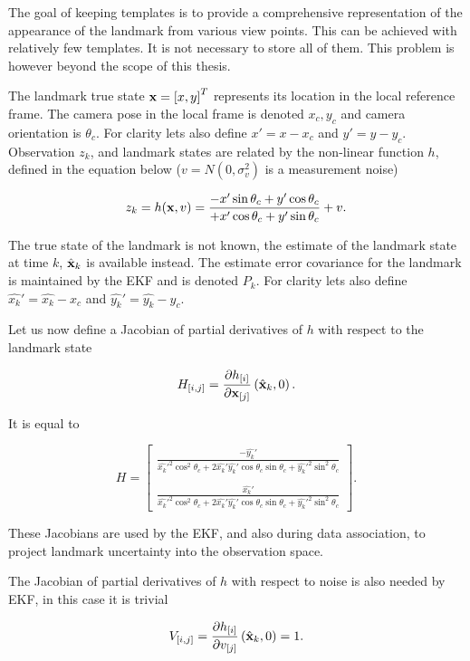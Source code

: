 The goal of keeping templates is to provide a comprehensive
representation of the appearance of the landmark from various view
points. This can be achieved with relatively few templates. It is not
necessary to store all of them.  This problem is however beyond the scope of this thesis.

The landmark true state ${\bf x} = \left[x,y \right]^T$ represents its
location in the local reference frame. The camera pose in the local frame
is denoted $x_c,y_c$ and camera orientation is $\theta_c$. For clarity
lets also define $x'=x-x_c$ and $y'=y-y_c$.  Observation $z_k$, and
landmark states are related by the non-linear function $h$, defined in
the equation below ($v = N(0,\sigma_{v}^2)$ is a measurement noise)

$$
z_k = h({\bf x},v) =
\frac{-x'\sin \theta_c + y' \cos \theta_c }
     {+x'\cos \theta_c + y' \sin \theta_c } + v.
$$

The true state of the landmark is not known, the estimate of the
landmark state at time $k$, $\hat{\bf x}_k$ is available
instead. The estimate error covariance for the landmark is maintained by
the EKF and is denoted $P_k$. For clarity lets also define
$\hat{x_k}'=\hat{x_k}-x_c$ and $\hat{y_k}'=\hat{y_k}-y_c$.

Let us now define a Jacobian of partial derivatives of $h$ with
respect to the landmark state

$$
H_{[i,j]} = \frac{\partial h_{[i]}}{\partial {\bf x}_{[j]}}
             \left(\hat{\bf x}_k , 0 \right).
$$

It is equal to

$$
  H = \left[ 
\begin{array}{c}
\frac{-\hat{y_k}'}
{\hat{x_k}'^2 \cos^2 \theta_c + 2\hat{x_k}'\hat{y_k}'\cos\theta_c\sin\theta_c + \hat{y_k}'^2\sin^2  \theta_c }\\
{}\\
\frac{\hat{x_k}'}
{\hat{x_k}'^2 \cos^2 \theta_c + 2\hat{x_k}'\hat{y_k}'\cos\theta_c\sin\theta_c + \hat{y_k}'^2\sin^2 \theta_c }
\end{array}
      \right].
$$

These Jacobians are used by the EKF, and also during data association,
to project landmark uncertainty into the observation space.

The Jacobian of partial derivatives of $h$ with respect
to noise is also needed by EKF, in this case it is trivial

$$
V_{[i,j]} = \frac{\partial h_{[i]}}{\partial v_{[j]}}
             \left(\hat{\bf x}_k , 0 \right) = 1.
$$


